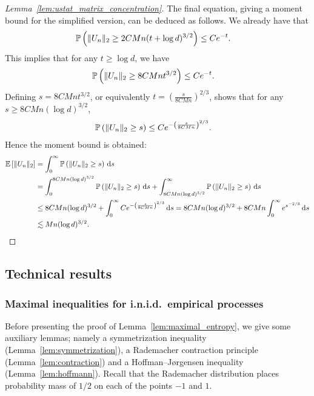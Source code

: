 \begin{proof}[Lemma~\ref{lem:ustat_matrix_concentration}]
  The final equation,
  giving a moment bound for the simplified version,
  can be deduced as follows.
  We already have that
  \begin{align*}
    \P\left(
      \|U_n\|_2
      \geq
      2 C M n
      (t + \log d)^{3/2}
    \right)
    &\leq
    C e^{-t}.
  \end{align*}
  This implies that for any $t \geq \log d$,
  we have
  \begin{align*}
    \P\left(
      \|U_n\|_2
      \geq
      8 C M n
      t^{3/2}
    \right)
    &\leq
    C e^{-t}.
  \end{align*}
  Defining
  $s = 8 C M n t^{3/2}$,
  or equivalently
  $t = \left( \frac{s}{8C M n} \right)^{2/3}$,
  shows that
  for any $s \geq 8C M n(\log d)^{3/2}$,
  \begin{align*}
    \P\left(
      \|U_n\|_2
      \geq
      s
    \right)
    &\leq
    C e^{-\left( \frac{s}{8C M n} \right)^{2/3}}.
  \end{align*}
  Hence the moment bound is obtained:
  \begin{align*}
    \E\left[
      \|U_n\|_2
    \right]
    &=
    \int_0^\infty
    \P\left(
      \|U_n\|_2
      \geq
      s
    \right)
    \diff{s} \\
    &=
    \int_0^{8C M n(\log d)^{3/2}}
    \P\left(
      \|U_n\|_2
      \geq
      s
    \right)
    \diff{s}
    +
    \int_{8C M n(\log d)^{3/2}}^\infty
    \P\left(
      \|U_n\|_2
      \geq
      s
    \right)
    \diff{s} \\
    &\leq
    8C M n(\log d)^{3/2}
    +
    \int_0^\infty
    C e^{-\left( \frac{s}{8C M n} \right)^{2/3}}
    \diff{s}
    =
    8C M n(\log d)^{3/2}
    +
    8C M n
    \int_0^\infty
    e^{s^{-2/3}}
    \diff{s} \\
    &\lesssim
    Mn(\log d)^{3/2}.
  \end{align*}
\end{proof}

\subsection{Technical results}

\subsubsection{Maximal inequalities for i.n.i.d.\ empirical processes}

Before presenting the proof of
Lemma~\ref{lem:maximal_entropy},
we give some auxiliary lemmas;
namely a symmetrization inequality
(Lemma~\ref{lem:symmetrization}),
a Rademacher contraction principle
(Lemma~\ref{lem:contraction})
and a Hoffman--J{\o}rgensen inequality
(Lemma~\ref{lem:hoffmann}).
Recall that the Rademacher distribution
places probability mass of $1/2$
on each of the points $-1$ and $1$.

